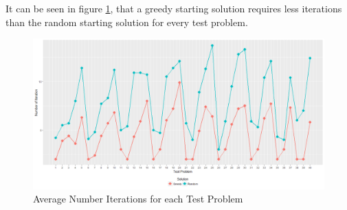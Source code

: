 \documentclass[11pt]{article}
\begin{document}
		It can be seen in figure \ref{Altiterations}, that a greedy starting solution requires less iterations than the random starting solution for every test problem.  
				
				\begin{figure}[H]
					\begin{center}
						\includegraphics[width=14cm]{Altiterations.png}
						\caption{Average Number Iterations for each Test Problem}
						\label{Altiterations}
					\end{center}
				\end{figure}
	
\end{document}
